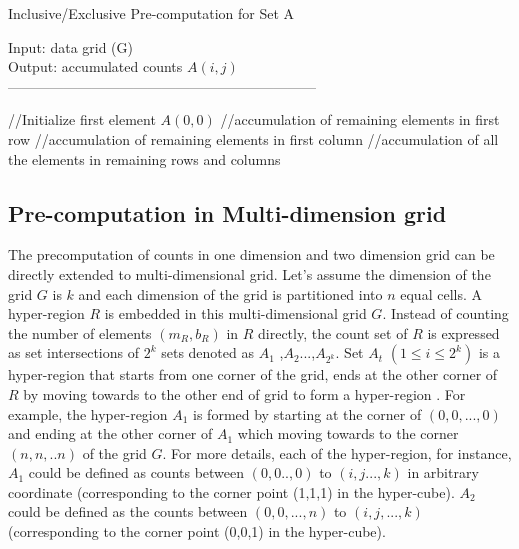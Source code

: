 \documentclass[AMA,LATO1COL]{WileyNJD-v2}
\begin{document}
\begin{algorithm}[t!]
\caption{Inclusive/Exclusive Pre-computation for Set A}\label{preinex}
Input: data grid (G) \\
Output: accumulated counts $A(i,j)$\\
------------------------------------------------------------------ \\
\begin{algorithmic}[1]
\State //Initialize first element $A(0,0)$
\State //accumulation of remaining elements in first row
\EndFor
\State //accumulation of remaining elements in first column
\EndFor
\State //accumulation of all the elements in remaining rows and columns
\EndFor
{}
\EndFor
\EndFor
\end{algorithmic}
\end{algorithm}


\subsection{Pre-computation in Multi-dimension grid}
The precomputation of counts in one dimension and two dimension grid can be directly extended to multi-dimensional grid.   Let's assume the dimension of the grid  $G$ is $k$ and each dimension of the grid is partitioned into $n$ equal cells. A hyper-region $R$ is embedded in this multi-dimensional grid $G$. Instead of counting the number of elements $( m_R, b_R)$  in $R$ directly,  the count set of $R$ is expressed as set intersections of $2^k$ sets denoted as $A_1$ ,$A_2$...,$A_{2^k}$.  Set $A_t$ $(1\leq i \leq {2^k})$ is a hyper-region that starts from one corner of the grid, ends at the other corner of $R$ by moving towards to the other end of grid to form a hyper-region .  For example,  the hyper-region  $A_1$ is formed by starting at the corner of $(0,0,...,0)$ and ending at the other corner of $A_1$ which moving towards to the corner $(n,n,..n)$ of  the grid $G$.  For more details,  each of the hyper-region, for instance, $A_1$ could be defined as counts between $(0,0..,0)$ to  $(i,j...,k)$ in arbitrary coordinate (corresponding to the corner point (1,1,1) in the hyper-cube).  $A_2$ could be defined as the counts between  $(0,0,...,n)$ to $(i,j,...,k)$ (corresponding to the corner point (0,0,1) in the hyper-cube).
\end{document}
